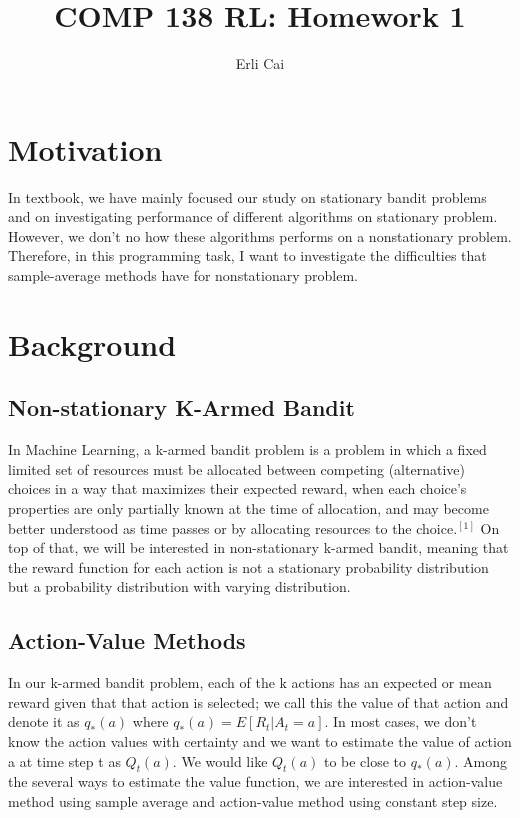 \documentclass[12pt]{article}
\title{COMP 138 RL: Homework 1}
\author{Erli Cai}
\begin{document}
\maketitle

\section{Motivation}
In textbook, we have mainly focused our study on stationary bandit problems and on investigating performance of different algorithms on stationary problem. However, we don't no how these algorithms performs on a nonstationary problem. Therefore, in this programming task, I want to investigate the difficulties that sample-average methods have for nonstationary problem.


\section{Background}
\subsection{Non-stationary K-Armed Bandit}
In Machine Learning, a k-armed bandit problem  is a problem in which a fixed limited set of resources must be allocated between competing (alternative) choices in a way that maximizes their expected reward, when each choice's properties are only partially known at the time of allocation, and may become better understood as time passes or by allocating resources to the choice.$^{[1]}$ On top of that, we will be interested in non-stationary k-armed bandit, meaning that the reward function for each action is not  a stationary probability distribution but a probability distribution with varying distribution.


\subsection{Action-Value Methods}
In our k-armed bandit problem, each of the k actions has an expected or mean reward given that that action is selected; we call this the value of that action and denote it as $q_*(a)$ where $q_*(a) = E[R_t |A_t = a]$. In most cases, we don't know the action values with certainty and we want to estimate the value of action a at time step t as $Q_t(a)$. We would like $Q_t(a)$ to be close to $q_*(a)$. Among the several ways to estimate the value function, we are interested in action-value method using sample average and action-value method using constant step size.
\end{document}
